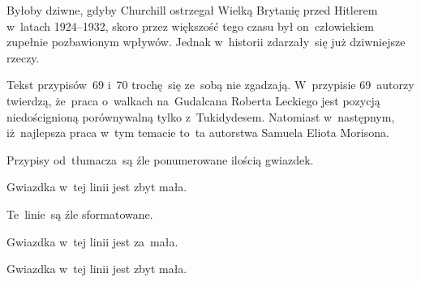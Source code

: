 \documentclass[a4paper,11pt]{article}
\begin{document}
\vspace{\spaceFour}





\noindent
{} Byłoby dziwne, gdyby Churchill ostrzegał Wielką Brytanię przed
Hitlerem w~latach 1924--1932, skoro przez większość tego czasu był
on~człowiekiem zupełnie pozbawionym wpływów. Jednak w~historii zdarzały~się
już dziwniejsze rzeczy.

\vspace{\spaceFour}





\noindent
{} Tekst przypisów~69 i~70 trochę~się ze~sobą nie zgadzają.
W~przypisie 69~autorzy twierdzą, że~praca o~walkach na~Gudalcana Roberta
Leckiego jest pozycją niedoścignioną porównywalną tylko z~Tukidydesem.
Natomiast w~następnym, iż~najlepsza praca w~tym temacie to~ta autorstwa
Samuela Eliota Morisona.

\vspace{\spaceFour}





\noindent
{} Przypisy od~tłumacza~są źle ponumerowane ilością gwiazdek.

\vspace{\spaceFour}





\noindent
{} Gwiazdka w~tej linii jest zbyt mała.

\vspace{\spaceFour}





\noindent
{} Te~linie~są źle sformatowane.

\vspace{\spaceFour}



\noindent
{} Gwiazdka w~tej linii jest za~mała.

\vspace{\spaceFour}





\noindent
{} Gwiazdka w~tej linii jest zbyt mała.

\vspace{\spaceFour}
\end{document}
